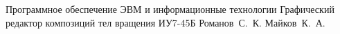 \documentclass{bmstu}
\begin{document}
{Программное обеспечение ЭВМ и информационные технологии} %
{Графический редактор композиций тел вращения} %
{ИУ7-45Б} %
{Романов~С.~К.} %
{Майков~К.~А.} %
{}
{}




\maketableofcontents








%
%

\makebibliography

%
\end{document}
